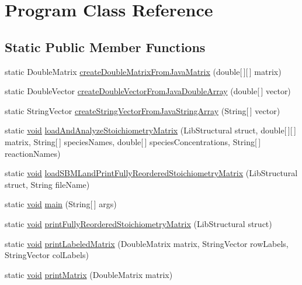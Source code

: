 \hypertarget{class_program}{}\section{Program Class Reference}
\label{class_program}
\subsection*{Static Public Member Functions}
\begin{DoxyCompactItemize}
\item 
static Double\+Matrix \hyperlink{class_program_aaba2796edde62c5328d3554a05092de4}{create\+Double\+Matrix\+From\+Java\+Matrix} (double\mbox{[}$\,$\mbox{]}\mbox{[}$\,$\mbox{]} matrix)
\item 
static Double\+Vector \hyperlink{class_program_a2969c558fddb07895085bf91921dab7b}{create\+Double\+Vector\+From\+Java\+Double\+Array} (double\mbox{[}$\,$\mbox{]} vector)
\item 
static String\+Vector \hyperlink{class_program_a7dcb6904302bba7866c7eb77d8b58359}{create\+String\+Vector\+From\+Java\+String\+Array} (String\mbox{[}$\,$\mbox{]} vector)
\item 
static \hyperlink{lp__lib_8h_ac7828c7b2b31d2e11af17bdb6289c5d9}{void} \hyperlink{class_program_a3db171f711903dfb0eea2199ec5b87c4}{load\+And\+Analyze\+Stoichiometry\+Matrix} (Lib\+Structural struct, double\mbox{[}$\,$\mbox{]}\mbox{[}$\,$\mbox{]} matrix, String\mbox{[}$\,$\mbox{]} species\+Names, double\mbox{[}$\,$\mbox{]} species\+Concentrations, String\mbox{[}$\,$\mbox{]} reaction\+Names)
\item 
static \hyperlink{lp__lib_8h_ac7828c7b2b31d2e11af17bdb6289c5d9}{void} \hyperlink{class_program_a4020c05ba0a5821c7a1e4699baec2560}{load\+S\+B\+M\+Land\+Print\+Fully\+Reordered\+Stoichiometry\+Matrix} (Lib\+Structural struct, String file\+Name)
\item 
static \hyperlink{lp__lib_8h_ac7828c7b2b31d2e11af17bdb6289c5d9}{void} \hyperlink{class_program_acce23ed8021e15e6d1b99a195c94c43e}{main} (String\mbox{[}$\,$\mbox{]} args)
\item 
static \hyperlink{lp__lib_8h_ac7828c7b2b31d2e11af17bdb6289c5d9}{void} \hyperlink{class_program_a7f3a62c279ae57e61c3ade3abe3d1293}{print\+Fully\+Reordered\+Stoichiometry\+Matrix} (Lib\+Structural struct)
\item 
static \hyperlink{lp__lib_8h_ac7828c7b2b31d2e11af17bdb6289c5d9}{void} \hyperlink{class_program_a656988b2d7a7272ac8d6bf5fdaf8da00}{print\+Labeled\+Matrix} (Double\+Matrix matrix, String\+Vector row\+Labels, String\+Vector col\+Labels)
\item 
static \hyperlink{lp__lib_8h_ac7828c7b2b31d2e11af17bdb6289c5d9}{void} \hyperlink{class_program_a9a10d587a6565cb7eba7da994fa1a9dd}{print\+Matrix} (Double\+Matrix matrix)
\end{DoxyCompactItemize}


